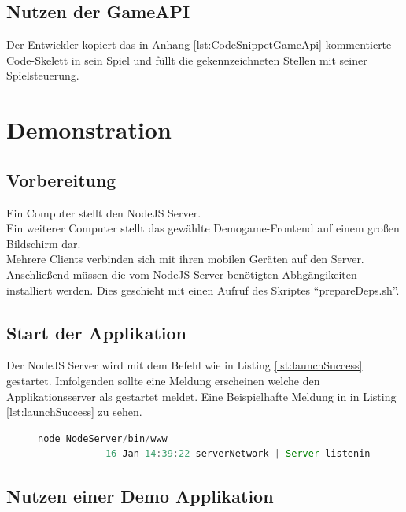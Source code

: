 \documentclass[a4paper]{spie}  %
\begin{document}
\subsection{Nutzen der GameAPI}
Der Entwickler kopiert das in Anhang \ref{lst:CodeSnippetGameApi} kommentierte Code-Skelett in sein Spiel und füllt die gekennzeichneten Stellen mit seiner Spielsteuerung.


\section{Demonstration}
\subsection{Vorbereitung}
Ein Computer stellt den NodeJS Server.\\
Ein weiterer Computer stellt das gewählte Demogame-Frontend auf einem großen Bildschirm dar.\\
Mehrere Clients verbinden sich mit ihren mobilen Geräten auf den Server.\\
Anschließend müssen die vom NodeJS Server benötigten Abhgängikeiten installiert werden. Dies geschieht mit einen Aufruf des Skriptes \enquote{prepareDeps.sh}.
\lstset{
  numbers=left,
  stepnumber=5,
  firstnumber=1,
  numberfirstline=true
}

\subsection{Start der Applikation}
Der NodeJS Server wird mit dem Befehl wie in Listing \ref{lst:launchSuccess} gestartet. Imfolgenden sollte eine Meldung erscheinen welche den Applikationsserver als gestartet meldet. Eine Beispielhafte Meldung in in Listing \ref{lst:launchSuccess} zu sehen.

\begin{figure}[h!]
	\centering
        \begin{lstlisting}[language=JavaScript,caption={Start der Applikation},label={lst:launchSuccess}]
            node NodeServer/bin/www
            16 Jan 14:39:22 serverNetwork | Server listening on port 5222
        \end{lstlisting}
\end{figure}
\subsection{Nutzen einer Demo Applikation}
\end{document}
